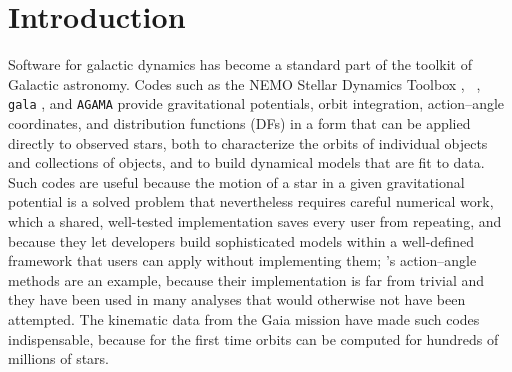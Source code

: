 \section{Introduction}\label{sec:intro}

Software for galactic dynamics has become a standard part of the toolkit
of Galactic astronomy. Codes such as the NEMO Stellar Dynamics Toolbox
\citep{Teuben1995}, \galpy\ \citep{Bovy2015}, \texttt{gala}
\citep{PriceWhelan2017}, and \texttt{AGAMA} \citep{Vasiliev2019}
provide gravitational potentials, orbit integration, action--angle
coordinates, and distribution functions (DFs) in a form that can be
applied directly to observed stars, both to characterize the orbits of
individual objects and collections of objects, and to build dynamical
models that are fit to data. Such codes are useful because the motion of
a star in a given gravitational potential is a solved problem that
nevertheless requires careful numerical work, which a shared,
well-tested implementation saves every user from repeating, and because
they let developers build sophisticated models within a well-defined
framework that users can apply without implementing them; \galpy's
action--angle methods are an example, because their implementation is
far from trivial and they have been used in many analyses that would
otherwise not have been attempted. The kinematic data from the Gaia
mission \citep{Gaia2016,Gaia2018,Gaia2023} have made such codes
indispensable, because for the first time orbits can be computed for
hundreds of millions of stars.

